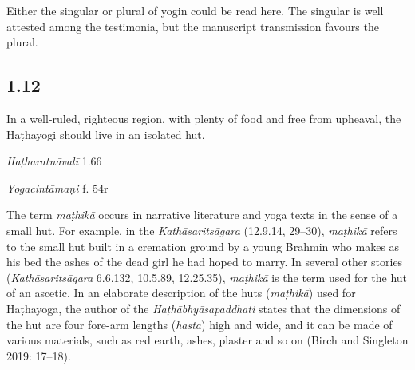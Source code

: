 \begin{ekdosis}
\begin{testimonia}[hp01_011]
\end{testimonia}

\begin{philcomm}[hp01_011]        
Either the singular or plural of yogin could be read here. The singular is well attested among the testimonia, but the manuscript transmission favours the plural.  
\end{philcomm}

\subsection*{1.12}
\begin{translation}[hp01_012]
In a well-ruled, righteous region, with plenty of food and free from upheaval, the Haṭhayogi should live in an isolated hut.%
\end{translation}

\begin{sources}[hp01_012]
\end{sources}

\begin{testimonia}[hp01_012]
\emph{Haṭharatnāvalī} 1.66

\begin{versinnote}
\end{versinnote}

\emph{Yogacintāmaṇi} f. 54r

\begin{versinnote}
\end{versinnote}

\end{testimonia}

\begin{philcomm}[hp01_012]  
The term \emph{maṭhikā} occurs in narrative literature and yoga texts in the sense of a small hut. For example, in the \textit{Kathāsaritsāgara} (12.9.14, 29–30), \emph{maṭhikā} refers to the small hut built in a cremation ground by a young Brahmin who makes as his bed the ashes of the dead girl he had hoped to marry. In several other stories (\textit{Kathāsaritsāgara} 6.6.132, 10.5.89, 12.25.35), \emph{maṭhikā} is the term used for the hut of an ascetic. In an elaborate description of the huts (\emph{maṭhikā}) used for Haṭhayoga, the author of the \emph{Haṭhābhyāsapaddhati} states that the dimensions of the hut are four fore-arm lengths (\emph{hasta}) high and wide, and it can be made of various materials, such as red earth, ashes, plaster and so on (Birch and Singleton 2019: 17–18).


\end{philcomm}
\end{ekdosis}
